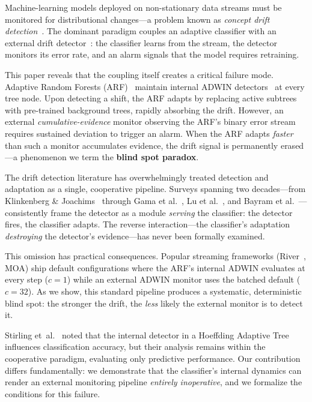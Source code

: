 \documentclass[10pt,conference]{IEEEtran}
\theoremstyle{definition}
\begin{document}
Machine-learning models deployed on non-stationary data streams must be monitored for distributional changes---a problem known as \emph{concept drift detection}~\cite{gama_survey_2014, lu_concept_drift_2018}.
The dominant paradigm couples an adaptive classifier with an external drift detector~\cite{gomes_arf_2017, bifet_adwin_2007}: the classifier learns from the stream, the detector monitors its error rate, and an alarm signals that the model requires retraining.

This paper reveals that the coupling itself creates a critical failure mode.
Adaptive Random Forests (ARF)~\cite{gomes_arf_2017} maintain internal ADWIN detectors~\cite{bifet_adwin_2007} at every tree node.
Upon detecting a shift, the ARF adapts by replacing active subtrees with pre-trained background trees, rapidly absorbing the drift.
However, an external \emph{cumulative-evidence} monitor observing the ARF's binary error stream requires sustained deviation to trigger an alarm.
When the ARF adapts \emph{faster} than such a monitor accumulates evidence, the drift signal is permanently erased---a phenomenon we term the \textbf{blind spot paradox}.

The drift detection literature has overwhelmingly treated detection and adaptation as a single, cooperative pipeline.
Surveys spanning two decades---from Klinkenberg \& Joachims~\cite{klinkenberg_2000} through Gama et al.~\cite{gama_survey_2014}, Lu et al.~\cite{lu_concept_drift_2018}, and Bayram et al.~\cite{bayram_2022}---consistently frame the detector as a module \emph{serving} the classifier: the detector fires, the classifier adapts.
The reverse interaction---the classifier's adaptation \emph{destroying} the detector's evidence---has never been formally examined.

This omission has practical consequences.
Popular streaming frameworks (River~\cite{montiel_river_2021}, MOA) ship default configurations where the ARF's internal ADWIN evaluates at every step ($c = 1$) while an external ADWIN monitor uses the batched default ($c = 32$).
As we show, this standard pipeline produces a systematic, deterministic blind spot: the stronger the drift, the \emph{less} likely the external monitor is to detect it.

Stirling et~al.~\cite{stirling_2018} noted that the internal detector in a Hoeffding Adaptive Tree influences classification accuracy, but their analysis remains within the cooperative paradigm, evaluating only predictive performance. Our contribution differs fundamentally: we demonstrate that the classifier's internal dynamics can render an external monitoring pipeline \emph{entirely inoperative}, and we formalize the conditions for this failure.
\end{document}

